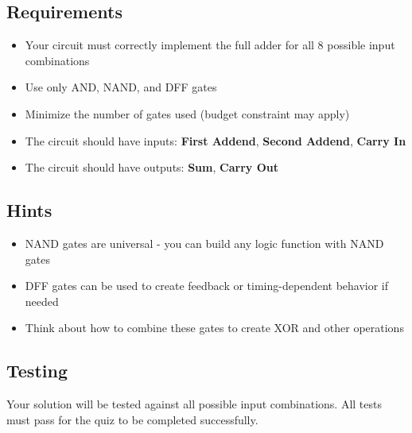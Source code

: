 \subsection*{Requirements}
\begin{itemize}
  \item Your circuit must correctly implement the full adder for all 8 possible input combinations
  \item Use only AND, NAND, and DFF gates
  \item Minimize the number of gates used (budget constraint may apply)
  \item The circuit should have inputs: \textbf{First Addend}, \textbf{Second Addend}, \textbf{Carry In}
  \item The circuit should have outputs: \textbf{Sum}, \textbf{Carry Out}
\end{itemize}

\subsection*{Hints}
\begin{itemize}
  \item NAND gates are universal - you can build any logic function with NAND gates
  \item DFF gates can be used to create feedback or timing-dependent behavior if needed
  \item Think about how to combine these gates to create XOR and other operations
\end{itemize}

\subsection*{Testing}
Your solution will be tested against all possible input combinations. All tests must pass for the quiz to be completed successfully.
